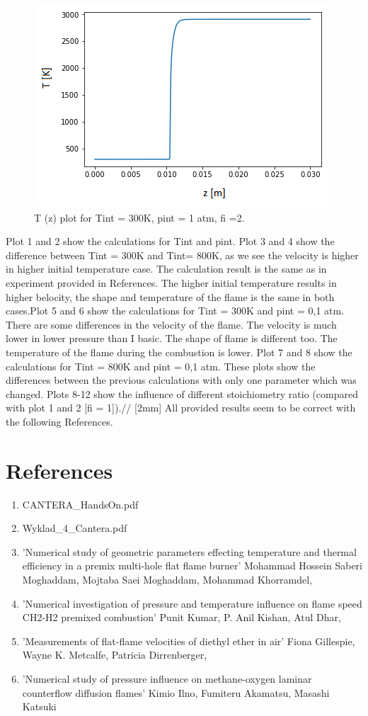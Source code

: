 \documentclass[11pt]{article}
\begin{document}
\begin{figure} [H]
	\begin{center}
\includegraphics[height=0.5\textwidth]{P12}
        \caption{T (z) plot for Tint = 300K, pint = 1 atm, fi =2.}
    \end{center}
\end{figure}
Plot 1 and 2 show the calculations for Tint and pint. Plot 3 and 4 show the difference between Tint = 300K and Tint= 800K, as we see the velocity is higher in higher initial temperature case.  The calculation result is the same as in experiment provided in References. The higher initial temperature results in higher belocity, the shape and temperature of the flame is the same in both cases.Plot 5 and 6 show the calculations for Tint = 300K and pint = 0,1 atm. There are some differences in the velocity of the flame. The velocity is much lower in lower pressure than I basic. The shape of flame is different too. The temperature of the flame during the combustion is lower. Plot 7 and 8 show the calculations for Tint = 800K and pint = 0,1 atm. These plots show the differences between the previous  calculations with only one parameter which was changed. Plots 8-12 show the influence of different stoichiometry ratio (compared with plot 1 and 2 [fi = 1]).//
[2mm]
All provided results seem to be correct with the following References.


\section{References}
\begin{enumerate}
	\item{CANTERA\_HandsOn.pdf}
    \item{Wyklad\_4\_Cantera.pdf}
    \item{'Numerical study of geometric parameters effecting temperature and thermal efficiency in a premix multi-hole flat flame burner'  Mohammad Hossein Saberi Moghaddam, Mojtaba Saei Moghaddam, Mohammad Khorramdel,}
    \item{'Numerical investigation of pressure and temperature influence on flame speed CH2-H2 premixed combustion'  Punit Kumar, P. Anil Kishan, Atul Dhar,}
    \item{'Measurements of flat-flame velocities of diethyl ether in air' Fiona Gillespie, Wayne K. Metcalfe, Patricia Dirrenberger,}
    \item{'Numerical study of pressure influence on methane-oxygen laminar counterflow diffusion flames' Kimio Ilno, Fumiteru Akamatsu, Masashi Katsuki}
\end{enumerate}
\end{document}
